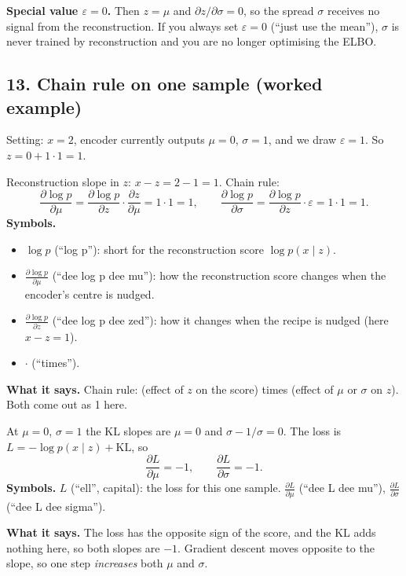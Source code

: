 \textbf{Special value $\varepsilon = 0$.} Then $z = \mu$ and $\partial z / \partial\sigma = 0$, so the spread $\sigma$ receives no signal from the reconstruction. If you always set $\varepsilon = 0$ (``just use the mean''), $\sigma$ is never trained by reconstruction and you are no longer optimising the ELBO.

\subsection*{13. Chain rule on one sample (worked example)}

Setting: $x = 2$, encoder currently outputs $\mu = 0$, $\sigma = 1$, and we draw $\varepsilon = 1$. So $z = 0 + 1 \cdot 1 = 1$.

Reconstruction slope in $z$: $x - z = 2 - 1 = 1$. Chain rule:
\[
\frac{\partial \log p}{\partial \mu} = \frac{\partial \log p}{\partial z}\cdot\frac{\partial z}{\partial \mu} = 1 \cdot 1 = 1,
\qquad
\frac{\partial \log p}{\partial \sigma} = \frac{\partial \log p}{\partial z}\cdot\varepsilon = 1 \cdot 1 = 1.
\]
\textbf{Symbols.}
\begin{itemize}[leftmargin=1.5em, itemsep=0pt]
\item $\log p$ (``log p''): short for the reconstruction score $\log p(x \mid z)$.
\item $\frac{\partial \log p}{\partial \mu}$ (``dee log p dee mu''): how the reconstruction score changes when the encoder's centre is nudged.
\item $\frac{\partial \log p}{\partial z}$ (``dee log p dee zed''): how it changes when the recipe is nudged (here $x - z = 1$).
\item $\cdot$ (``times'').
\end{itemize}
\textbf{What it says.} Chain rule: (effect of $z$ on the score) times (effect of $\mu$ or $\sigma$ on $z$). Both come out as 1 here.

At $\mu = 0$, $\sigma = 1$ the KL slopes are $\mu = 0$ and $\sigma - 1/\sigma = 0$. The loss is $L = -\log p(x \mid z) + \mathrm{KL}$, so
\[
\frac{\partial L}{\partial \mu} = -1, \qquad \frac{\partial L}{\partial \sigma} = -1.
\]
\textbf{Symbols.} $L$ (``ell'', capital): the loss for this one sample. $\frac{\partial L}{\partial \mu}$ (``dee L dee mu''), $\frac{\partial L}{\partial \sigma}$ (``dee L dee sigma'').

\textbf{What it says.} The loss has the opposite sign of the score, and the KL adds nothing here, so both slopes are $-1$. Gradient descent moves opposite to the slope, so one step \emph{increases} both $\mu$ and $\sigma$.

